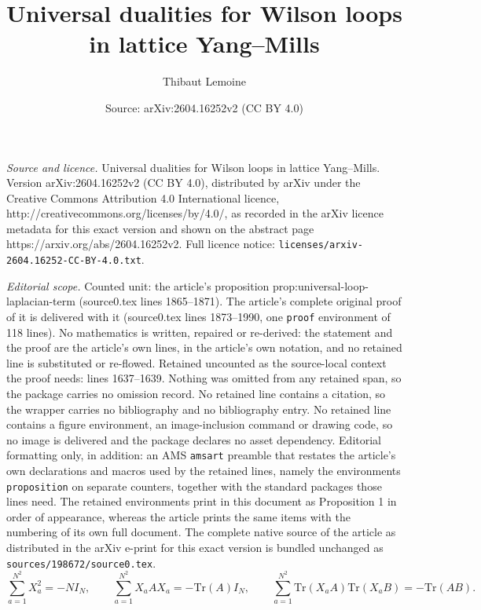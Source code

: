 \documentclass[10pt,a4paper]{amsart}
\title{Universal dualities for Wilson loops in lattice Yang--Mills}
\author{Thibaut Lemoine}
\date{Source: arXiv:2604.16252v2 (CC BY 4.0)}
\newcommand\Tr{\mathrm{Tr}}
\begin{document}
\maketitle

\noindent\emph{Source and licence.} Universal dualities for Wilson loops in lattice Yang--Mills. Version arXiv:2604.16252v2 (CC BY 4.0), distributed by arXiv under the Creative Commons Attribution 4.0 International licence, http://creativecommons.org/licenses/by/4.0/, as recorded in the arXiv licence metadata for this exact version and shown on the abstract page https://arxiv.org/abs/2604.16252v2. Full licence notice: \texttt{licenses/arxiv-2604.16252-CC-BY-4.0.txt}.\par\smallskip

\noindent\textit{Editorial scope.} Counted unit: the article's proposition prop:universal-loop-laplacian-term (source0.tex lines 1865--1871). The article's complete original proof of it is delivered with it (source0.tex lines 1873--1990, one \texttt{proof} environment of 118 lines). No mathematics is written, repaired or re-derived: the statement and the proof are the article's own lines, in the article's own notation, and no retained line is substituted or re-flowed.  Retained uncounted as the source-local context the proof needs: lines 1637--1639.  Nothing was omitted from any retained span, so the package carries no omission record.  No retained line contains a citation, so the wrapper carries no bibliography and no bibliography entry.  No retained line contains a figure environment, an image-inclusion command or drawing code, so no image is delivered and the package declares no asset dependency.  Editorial formatting only, in addition: an AMS \texttt{amsart} preamble that restates the article's own declarations and macros used by the retained lines, namely the environments \texttt{proposition} on separate counters, together with the standard packages those lines need.  The retained environments print in this document as Proposition 1 in order of appearance, whereas the article prints the same items with the numbering of its own full document.  The complete native source of the article as distributed in the arXiv e-print for this exact version is bundled unchanged as \texttt{sources/198672/source0.tex}.
\begin{equation}\label{eq:magic}
\sum_{a=1}^{N^2}X_a^2=-NI_N,\qquad \sum_{a=1}^{N^2} X_aAX_a=-\Tr(A)I_N,\qquad \sum_{a=1}^{N^2} \Tr(X_aA)\Tr(X_aB)=-\Tr(AB).
\end{equation}
\end{document}
